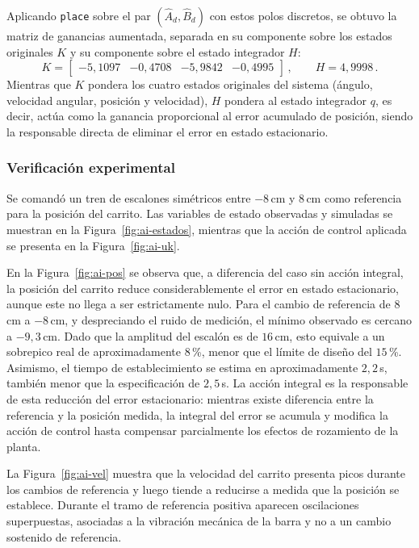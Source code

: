 Aplicando \texttt{place} sobre el par $(\widehat{A}_d, \widehat{B}_d)$ con estos polos discretos, se obtuvo la matriz de ganancias aumentada, separada en su componente sobre los estados originales $K$ y su componente sobre el estado integrador $H$:
\[
K = \begin{bmatrix} -5,1097 & -0,4708 & -5,9842 & -0,4995 \end{bmatrix}\,, \qquad H = 4,9998\,.
\]
Mientras que $K$ pondera los cuatro estados originales del sistema (ángulo, velocidad angular, posición y velocidad), $H$ pondera al estado integrador $q$, es decir, actúa como la ganancia proporcional al error acumulado de posición, siendo la responsable directa de eliminar el error en estado estacionario.

\subsubsection{Verificación experimental}

Se comandó un tren de escalones simétricos entre $-8\,$cm y $8\,$cm como referencia para la posición del carrito. Las variables de estado observadas y simuladas se muestran en la Figura~\ref{fig:ai-estados}, mientras que la acción de control aplicada se presenta en la Figura~\ref{fig:ai-uk}.

En la Figura~\ref{fig:ai-pos} se observa que, a diferencia del caso sin acción integral, la posición del carrito reduce considerablemente el error en estado estacionario, aunque este no llega a ser estrictamente nulo. Para el cambio de referencia de $8\,$cm a $-8\,$cm, y despreciando el ruido de medición, el mínimo observado es cercano a $-9,3\,$cm. Dado que la amplitud del escalón es de $16\,$cm, esto equivale a un sobrepico real de aproximadamente $8\,$\%, menor que el límite de diseño del $15\,$\%. Asimismo, el tiempo de establecimiento se estima en aproximadamente $2,2\,$s, también menor que la especificación de $2,5\,$s. La acción integral es la responsable de esta reducción del error estacionario: mientras existe diferencia entre la referencia y la posición medida, la integral del error se acumula y modifica la acción de control hasta compensar parcialmente los efectos de rozamiento de la planta.

La Figura~\ref{fig:ai-vel} muestra que la velocidad del carrito presenta picos durante los cambios de referencia y luego tiende a reducirse a medida que la posición se establece. Durante el tramo de referencia positiva aparecen oscilaciones superpuestas, asociadas a la vibración mecánica de la barra y no a un cambio sostenido de referencia.

